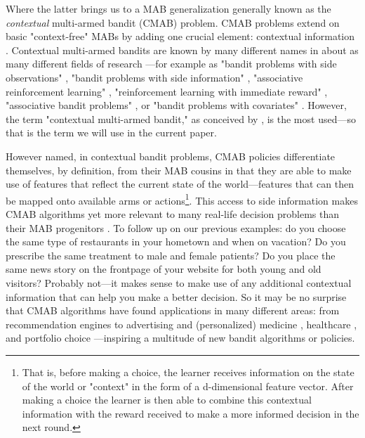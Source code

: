 \documentclass{jss}
\begin{document}
Where the latter brings us to a MAB generalization generally known as the \textit{contextual} multi-armed bandit (CMAB) problem. CMAB problems extend on basic "context-free" MABs by adding one crucial element: contextual information \citep{Langford2008}. Contextual multi-armed bandits are known by many different names in about as many different fields of research \citep{Tewari2017}---for example as "bandit problems with side observations" \citep{Wang2005a}, "bandit problems with side information" \citep{Lu2010}, "associative reinforcement learning" \citep{Kaelbling1996}, "reinforcement learning with immediate reward" \citep{Abe2003}, "associative bandit problems" \citep{Strehl2006}, or "bandit problems with covariates" \citep{Sarkar1991}. However, the term "contextual multi-armed bandit," as conceived by \cite{Langford2008}, is the most used---so that is the term we will use in the current paper.

However named, in contextual bandit problems, CMAB policies differentiate themselves, by definition, from their MAB cousins in that they are able to make use of features that reflect the current state of the world---features that can then be mapped onto available arms or actions\footnote{That is, before making a choice, the learner receives information on the state of the world or "context" in the form of a d-dimensional feature vector. After making a choice the learner is then able to combine this contextual information with the reward received to make a more informed decision in the next round.}. This access to side information makes CMAB algorithms yet more relevant to many real-life decision problems than their MAB progenitors \citep{Langford2008}. To follow up on our previous examples: do you choose the same  type of restaurants in your hometown and when on vacation? Do you prescribe the same treatment to male and female patients? Do you place the same news story on the frontpage of your website for both young and old visitors? Probably not---it makes sense to make use of any additional contextual information that can help you make a better decision. So it may be no surprise that CMAB algorithms have found applications in many different areas: from recommendation engines \citep{Lai1985} to advertising \citep{Tang2013} and (personalized) medicine \citep{Katehakis1986,Tewari2017}, healthcare \citep{Rabbi2015}, and portfolio choice \citep{Shen2015}---inspiring a multitude of new bandit algorithms or policies.
\end{document}
